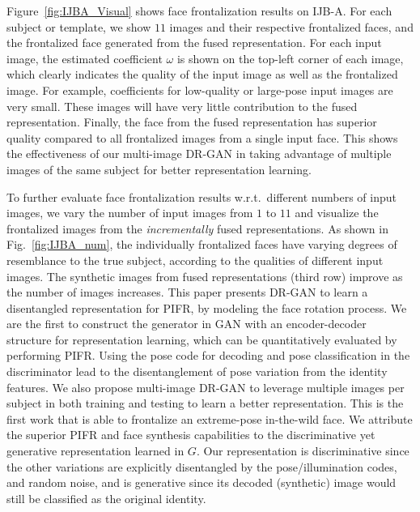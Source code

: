 \documentclass[10pt,journal,compsoc]{IEEEtran}
\begin{document}
Figure~\ref{fig:IJBA_Visual} shows face frontalization results on IJB-A. 
For each subject or template, we show $11$ images and their respective frontalized faces, and the frontalized face generated from the fused representation. 
For each input image, the estimated coefficient $\omega$ is shown on the top-left corner of each image, which clearly indicates the quality of the input image as well as the frontalized image. 
For example, coefficients for low-quality or large-pose input images are very small. 
These images will have very little contribution to the fused representation. 
Finally, the face from the fused representation has superior quality compared to all frontalized images from a single input face. 
This shows the effectiveness of our multi-image DR-GAN in taking advantage of multiple images of the same subject for better representation learning. 

To further evaluate face frontalization results w.r.t.~different numbers of input images, we vary the number of input images from $1$ to $11$ and visualize the frontalized images from the {\it incrementally} fused representations. 
As shown in Fig.~\ref{fig:IJBA_num}, the individually frontalized faces have varying degrees of resemblance to the true subject, according to the qualities of different input images. 
The synthetic images from fused representations (third row) improve as the number of images increases. 
This paper presents DR-GAN to learn a disentangled representation for PIFR, by modeling the face rotation process. 
We are the first to construct the generator in GAN with an encoder-decoder structure for representation learning, which can be quantitatively evaluated by performing PIFR.  
Using the pose code for decoding and pose classification in the discriminator lead to the disentanglement of pose variation from the identity features. 
We also propose multi-image DR-GAN to leverage multiple images per subject in both training and testing to learn a better representation. %
This is the first work that is able to frontalize an extreme-pose in-the-wild face. 
We attribute the superior PIFR and face synthesis capabilities to the discriminative yet generative representation learned in $G$. 
Our representation is discriminative since the other variations are explicitly disentangled by the pose/illumination codes, and random noise, and is generative since its decoded (synthetic) image would still be classified as the original identity.
\end{document}
